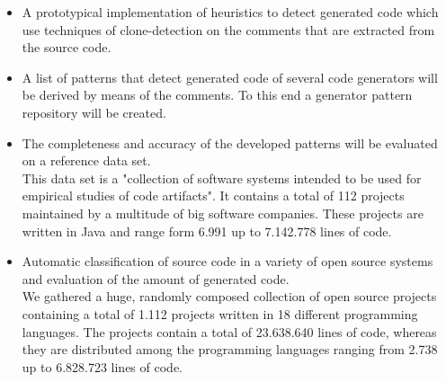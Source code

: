 \begin{itemize}
	\item A prototypical implementation of heuristics to detect generated code which use techniques of clone-detection on the comments that are extracted from the source code.
	\item A list of patterns that detect generated code of several code generators will be derived by means of the comments. To this end a generator pattern repository will be created.
	\item The completeness and accuracy of the developed patterns will be evaluated on a reference data set.\\
	This data set is a "collection of software systems intended to be used for empirical studies of code artifacts"\cite{TemperoEwanandAnslowCraigandDietrichJensandHanTedandLiJingandLumpeMarkusandMeltonHaydenandNoble2010a}. It contains a total of 112 projects maintained by a multitude of big software companies. These projects are written in Java and range form 6.991 up to 7.142.778 lines of code.
	\item Automatic classification of source code in a variety of open source systems and evaluation of the amount of generated code.\\
	We gathered a huge, randomly composed collection of open source projects containing a total of 1.112 projects written in 18 different programming languages. The projects contain a total of 23.638.640 lines of code, whereas they are distributed among the programming languages ranging from 2.738 up to 6.828.723 lines of code. 
\end{itemize}